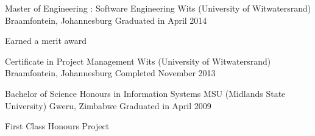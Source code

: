 


\begin{cventries}


\cventry
{Master of Engineering : Software Engineering} %
{Wits (University of Witwatersrand)} %
{Braamfontein, Johannesburg} %
{Graduated in April 2014} %
{ %
	\begin{cvitems}
		\item {Earned a merit award}
	\end{cvitems}
}


\cventry
{Certificate in Project Management} %
{Wits (University of Witwatersrand)} %
{Braamfontein, Johannesburg} %
{Completed November 2013} %
{}


\cventry
{Bachelor of Science Honours in Information Systems} %
{MSU (Midlands State University)} %
{Gweru, Zimbabwe} %
{Graduated in April 2009} %
{ %
\begin{cvitems}
	\item First Class Honours Project
\end{cvitems}	
}


\end{cventries}